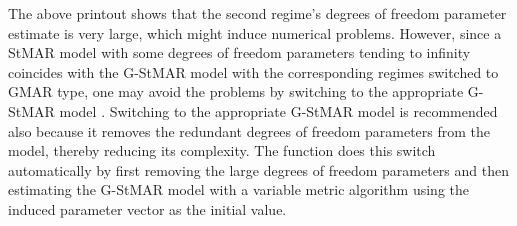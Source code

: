 \documentclass[nojss]{jss} %
\begin{document}
The above printout shows that the second regime's degrees of freedom parameter estimate is very large, which might induce numerical problems. However, since a StMAR model with some degrees of freedom parameters tending to infinity coincides with the G-StMAR model with the corresponding regimes switched to GMAR type, one may avoid the problems by switching to the appropriate G-StMAR model \citep[Section 4]{Virolainen:2020}. Switching to the appropriate G-StMAR model is recommended also because it removes the redundant degrees of freedom parameters from the model, thereby reducing its complexity. The function  does this switch automatically by first removing the large degrees of freedom parameters and then estimating the G-StMAR model with a variable metric algorithm \citep[algorithm 21]{Nash:1990} using the induced parameter vector as the initial value.
\end{document}
